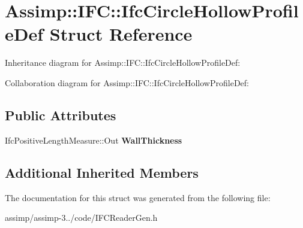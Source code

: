 \hypertarget{struct_assimp_1_1_i_f_c_1_1_ifc_circle_hollow_profile_def}{\section{Assimp\+:\+:I\+F\+C\+:\+:Ifc\+Circle\+Hollow\+Profile\+Def Struct Reference}
\label{struct_assimp_1_1_i_f_c_1_1_ifc_circle_hollow_profile_def}
}


Inheritance diagram for Assimp\+:\+:I\+F\+C\+:\+:Ifc\+Circle\+Hollow\+Profile\+Def\+:


Collaboration diagram for Assimp\+:\+:I\+F\+C\+:\+:Ifc\+Circle\+Hollow\+Profile\+Def\+:
\subsection*{Public Attributes}
\begin{DoxyCompactItemize}
\item 
\hypertarget{struct_assimp_1_1_i_f_c_1_1_ifc_circle_hollow_profile_def_aa7ec96c0bffc4f07ae53d2bb1ad15f31}{Ifc\+Positive\+Length\+Measure\+::\+Out {\bfseries Wall\+Thickness}}\label{struct_assimp_1_1_i_f_c_1_1_ifc_circle_hollow_profile_def_aa7ec96c0bffc4f07ae53d2bb1ad15f31}

\end{DoxyCompactItemize}
\subsection*{Additional Inherited Members}


The documentation for this struct was generated from the following file\+:\begin{DoxyCompactItemize}
\item 
assimp/assimp-\/3../code/I\+F\+C\+Reader\+Gen.\+h\end{DoxyCompactItemize}
